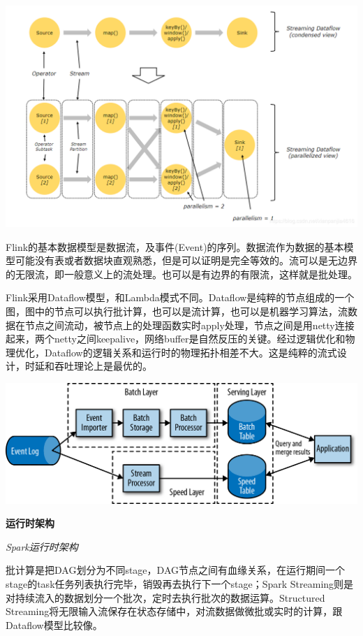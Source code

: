 \documentclass{ctexart}
\begin{document}
\includegraphics[width=\textwidth]{shujumoxing2.png}

Flink的基本数据模型是数据流，及事件(Event)的序列。数据流作为数据的基本模型可能没有表或者数据块直观熟悉，但是可以证明是完全等效的。流可以是无边界的无限流，即一般意义上的流处理。也可以是有边界的有限流，这样就是批处理。

Flink采用Dataflow模型，和Lambda模式不同。Dataflow是纯粹的节点组成的一个图，图中的节点可以执行批计算，也可以是流计算，也可以是机器学习算法，流数据在节点之间流动，被节点上的处理函数实时apply处理，节点之间是用netty连接起来，两个netty之间keepalive，网络buffer是自然反压的关键。经过逻辑优化和物理优化，Dataflow的逻辑关系和运行时的物理拓扑相差不大。这是纯粹的流式设计，时延和吞吐理论上是最优的。

\includegraphics[width=\textwidth]{lambdaarch.png}

\textbf{运行时架构}

\textit{Spark运行时架构}

批计算是把DAG划分为不同stage，DAG节点之间有血缘关系，在运行期间一个stage的task任务列表执行完毕，销毁再去执行下一个stage；Spark Streaming则是对持续流入的数据划分一个批次，定时去执行批次的数据运算。Structured Streaming将无限输入流保存在状态存储中，对流数据做微批或实时的计算，跟Dataflow模型比较像。
\end{document}
